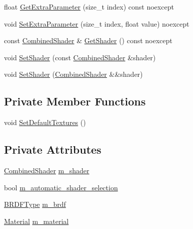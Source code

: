 \begin{DoxyCompactItemize}
\item 
float \hyperlink{structmage_1_1_shaded_material_af2843c2ec63800443e6fee28147cd8bb}{Get\+Extra\+Parameter} (size\+\_\+t index) const noexcept
\item 
void \hyperlink{structmage_1_1_shaded_material_acf33a3820b485d0402d132275ed4d515}{Set\+Extra\+Parameter} (size\+\_\+t index, float value) noexcept
\item 
const \hyperlink{structmage_1_1_combined_shader}{Combined\+Shader} \& \hyperlink{structmage_1_1_shaded_material_a1d1affd63d0a2dd8543a10600a267e0b}{Get\+Shader} () const noexcept
\item 
void \hyperlink{structmage_1_1_shaded_material_a65646872fce0961e7ac346be162e89ec}{Set\+Shader} (const \hyperlink{structmage_1_1_combined_shader}{Combined\+Shader} \&shader)
\item 
void \hyperlink{structmage_1_1_shaded_material_ae1c0fe052ef1cfb3c65ddf1ad9de8abb}{Set\+Shader} (\hyperlink{structmage_1_1_combined_shader}{Combined\+Shader} \&\&shader)
\end{DoxyCompactItemize}
\subsection*{Private Member Functions}
\begin{DoxyCompactItemize}
\item 
void \hyperlink{structmage_1_1_shaded_material_afbd4b9d4a2f348124c08c005a712477d}{Set\+Default\+Textures} ()
\end{DoxyCompactItemize}
\subsection*{Private Attributes}
\begin{DoxyCompactItemize}
\item 
\hyperlink{structmage_1_1_combined_shader}{Combined\+Shader} \hyperlink{structmage_1_1_shaded_material_a712d07ac1995ff592bbb8ab20a294270}{m\+\_\+shader}
\item 
bool \hyperlink{structmage_1_1_shaded_material_a744f6e4c0318f29f343039d6be072b66}{m\+\_\+automatic\+\_\+shader\+\_\+selection}
\item 
\hyperlink{namespacemage_ae7a7a03a7b34d7e2689689bb8295cd38}{B\+R\+D\+F\+Type} \hyperlink{structmage_1_1_shaded_material_a59a4b0ecb6ab1d60a285e0f1f69b5e36}{m\+\_\+brdf}
\item 
\hyperlink{structmage_1_1_material}{Material} \hyperlink{structmage_1_1_shaded_material_a319e1ca2103c50f84ce0605b08bd34b4}{m\+\_\+material}
\end{DoxyCompactItemize}


